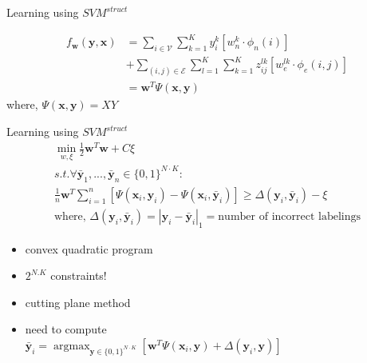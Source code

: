 \documentclass{beamer}
\DeclareMathOperator*{\argmax}{argmax}
\newcommand{\n}{{n}}             %
\newcommand{\x}{{\mathbf x}}     %
\newcommand{\y}{{\mathbf y}}     %
\newcommand{\ysc}[2]{{y_{#1}^{#2}}}    %
\newcommand{\zsc}[2]{{z_{#1}^{#2}}}    %
\newcommand{\fn}[1]{{\phi_n(#1)}}      %
\newcommand{\fe}[3]{{\phi_{#1}(#2,#3)}}%
\newcommand{\w}{{\mathbf w}}           %
\newcommand{\wn}[1]{{w_n^{#1}}}        %
\newcommand{\we}[3]{{w_{#1}^{#2#3}}}   %
\newcommand{\df}[3]{{f_{#3}(#1,#2)}}   %
\newcommand{\loss}[2]{{\Delta(#1,#2)}}   %
\begin{document}
\begin{frame}{Learning using $SVM^{struct}$}

\begin{equation} \label{eq:model}
\begin{split}
\df{\y}{\x}{\w} & = \sum_{i \in \mathcal{V}} \sum_{k=1}^{K} \ysc{i}{k} \left[\wn{k} \cdot \fn{i} \right] \\
 & + \sum_{(i,j)\in \mathcal{E}}   \sum_{l=1}^{K}  \sum_{k=1}^{K}  \zsc{ij}{lk}   \left[\we{e}{l}{k} \cdot \fe{e}{i}{j}\right] \\
& = \w^T \Psi(\x,\y)
 \end{split}
\end{equation}
where, $\Psi(\x,\y)=XY$

\end{frame}

\begin{frame}{Learning using $SVM^{struct}$}
\begin{eqnarray*} \label{eq:trainqp}
\min_{w,\xi}    \frac{1}{2} \w^T\w + C\xi\\
s.t.   \forall \bar{\y}_1,...,\bar{\y}_\n \in \{0,1\}^{N \cdot K} :\\
 \frac{1}{n} \w^T \sum_{i=1}^{n} [\Psi( \x_i, \y_i) \nonumber - \Psi(\x_i,\bar{\y}_i)] \ge \Delta(\y_i,\bar{\y}_i) -\xi \nonumber \\
\text{where, } \Delta(\y_i,\bar{\y}_i)=|\y_i-\bar{\y}_i|_1=\text{number of incorrect labelings}
\end{eqnarray*}

\begin{itemize}
\item convex quadratic program
\item $2^{N.K}$ constraints!
\item cutting plane method
\item need to compute \\ $\bar{\y}_i  = \argmax_{\y \in \{0,1\}^{N \cdot K}} \left[ \w^T \Psi(\x_i,\y) + \loss{\y_i}{\y} \right]$
\end{itemize}
\end{frame}
\end{document}
